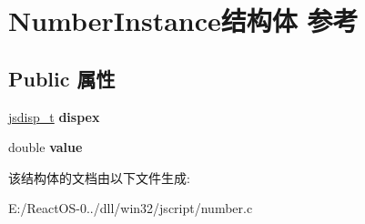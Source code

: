\hypertarget{struct_number_instance}{}\section{Number\+Instance结构体 参考}
\label{struct_number_instance}
\subsection*{Public 属性}
\begin{DoxyCompactItemize}
\item 
\mbox{\label{struct_number_instance_a01d295832557d3005af97ed99c3e9783}} 
\hyperlink{structjsdisp__t}{jsdisp\+\_\+t} {\bfseries dispex}
\item 
\mbox{\label{struct_number_instance_a1604e4c0f8caa066b46be28e28afc8b6}} 
double {\bfseries value}
\end{DoxyCompactItemize}


该结构体的文档由以下文件生成\+:\begin{DoxyCompactItemize}
\item 
E\+:/\+React\+O\+S-\/0../dll/win32/jscript/number.\+c\end{DoxyCompactItemize}
